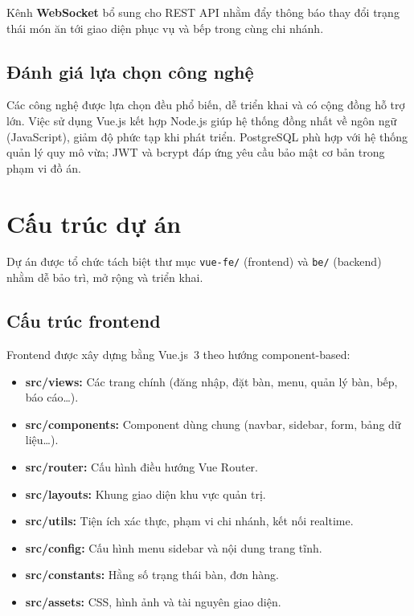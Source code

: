 \documentclass[../DoAn.tex]{subfiles}
\begin{document}
Kênh \textbf{WebSocket} bổ sung cho REST API nhằm đẩy thông báo thay đổi trạng thái món ăn tới giao diện phục vụ và bếp trong cùng chi nhánh.

\subsection{Đánh giá lựa chọn công nghệ}

Các công nghệ được lựa chọn đều phổ biến, dễ triển khai và có cộng đồng hỗ trợ lớn.
Việc sử dụng Vue.js kết hợp Node.js giúp hệ thống đồng nhất về ngôn ngữ (JavaScript), giảm độ phức tạp khi phát triển.
PostgreSQL phù hợp với hệ thống quản lý quy mô vừa; JWT và bcrypt đáp ứng yêu cầu bảo mật cơ bản trong phạm vi đồ án.

\section{Cấu trúc dự án}
\label{section:4.2}

Dự án được tổ chức tách biệt thư mục \texttt{vue-fe/} (frontend) và \texttt{be/} (backend) nhằm dễ bảo trì, mở rộng và triển khai.

\subsection{Cấu trúc frontend}

Frontend được xây dựng bằng Vue.js~3 theo hướng component-based:

\begin{itemize}
    \item \textbf{src/views:} Các trang chính (đăng nhập, đặt bàn, menu, quản lý bàn, bếp, báo cáo\ldots).
    \item \textbf{src/components:} Component dùng chung (navbar, sidebar, form, bảng dữ liệu\ldots).
    \item \textbf{src/router:} Cấu hình điều hướng Vue Router.
    \item \textbf{src/layouts:} Khung giao diện khu vực quản trị.
    \item \textbf{src/utils:} Tiện ích xác thực, phạm vi chi nhánh, kết nối realtime.
    \item \textbf{src/config:} Cấu hình menu sidebar và nội dung trang tĩnh.
    \item \textbf{src/constants:} Hằng số trạng thái bàn, đơn hàng.
    \item \textbf{src/assets:} CSS, hình ảnh và tài nguyên giao diện.
\end{itemize}
\end{document}
